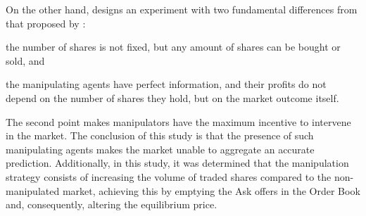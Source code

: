On the other hand, \citeauthor{deck2013affecting} designs an experiment with two fundamental differences from that proposed by : \begin{enumerate*}[label=(\roman*)]
    \item the number of shares is not fixed, but any amount of shares can be bought or sold, and
    \item the manipulating agents have perfect information, and their profits do not depend on the number of shares they hold, but on the market outcome itself.
\end{enumerate*} 
The second point makes manipulators have the maximum incentive to intervene in the market. The conclusion of this study is that the presence of such manipulating agents makes the market unable to aggregate an accurate prediction. Additionally, in this study, it was determined that the manipulation strategy consists of increasing the volume of traded shares compared to the non-manipulated market, achieving this by emptying the Ask offers in the Order Book and, consequently, altering the equilibrium price.
